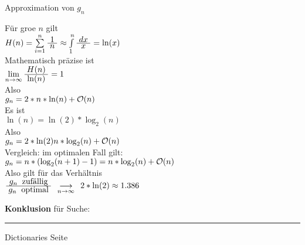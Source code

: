 
\begin{slide}{}
\normalsize

\begin{center}
Approximation von $g_n$
\end{center}
\vspace*{0.5cm}

\footnotesize
F\"ur gro\3e $n$ gilt \\[0.3cm]
\hspace*{1.3cm} $H(n) = \sum\limits_{i=1}^n \frac{\displaystyle\;1\;}{\displaystyle\;n\;} \approx \int\limits_1^n \frac{\displaystyle\;dx\;}{\displaystyle\;x\;} = \ln(x)$ \\[0.3cm]
Mathematisch pr\"azise ist \\[0.3cm]
\hspace*{1.3cm} $\lim\limits_{n\rightarrow\infty} \frac{\displaystyle\;H(n)\;}{\displaystyle\;\ln(n)\;} = 1$ \\[0.3cm]
Also \\[0.3cm]
\hspace*{1.3cm} $g_n = 2 * n * \ln(n) + \mathcal{O}(n)$ \\[0.3cm]
Es ist \\[0.3cm]
\hspace*{1.3cm} $\ln(n) = \ln(2) * \log_2(n)$ \\[0.3cm]
Also \\[0.3cm]
\hspace*{1.3cm} $g_n = 2 * \ln(2) n * \log_2(n) + \mathcal{O}(n)$ \\[0.3cm]
Vergleich: im optimalen Fall gilt: \\[0.3cm]
\hspace*{1.3cm} $g_n = n * (\log_2(n+1)-1)= n * \log_2(n) + \mathcal{O}(n)$ \\[0.3cm]
Also gilt f\"ur das Verh\"altnis \\[0.3cm]
\hspace*{1.3cm} $\frac{\displaystyle\;g_n\;\; \mbox{zuf\"allig}\;}{\displaystyle\;g_n\;\; \mbox{optimal}\;} \;\;_{\displaystyle \longrightarrow \atop {\scriptstyle n \rightarrow \infty}}\;\; 2 * \ln(2) \approx 1.386$

\textbf{Konklusion} f\"ur Suche: \\[0.9cm]
\hspace*{0.3cm} 


\vspace*{0.3cm}

\vspace*{\fill}
\tiny \addtocounter{mypage}{1}
\rule{17cm}{1mm}
Dictionaries  \hspace*{\fill} Seite 
\end{slide}

